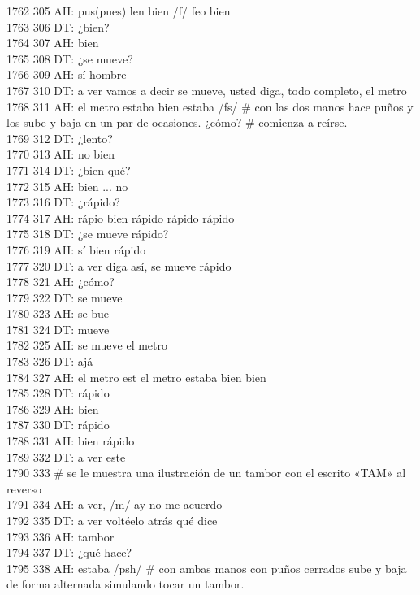 1762 305 AH: pus(pues) len bien /f/ feo bien \\
1763 306 DT: ¿bien?\\
1764 307 AH: bien\\
1765 308 DT: ¿se mueve?\\
1766 309 AH: sí hombre\\
1767 310 DT: a ver vamos a decir se mueve, usted diga, todo completo, el metro\\
1768 311 AH: el metro estaba bien estaba /fs/ # con las dos manos hace puños y los sube y baja en un par de ocasiones. ¿cómo? # comienza a reírse.\\
1769 312 DT: ¿lento?\\
1770 313 AH: no bien\\
1771 314 DT: ¿bien qué?\\
1772 315 AH: bien ... no\\
1773 316 DT: ¿rápido?\\
1774 317 AH: rápio bien rápido rápido rápido\\
1775 318 DT: ¿se mueve rápido?\\
1776 319 AH: sí bien rápido\\
1777 320 DT: a ver diga así, se mueve rápido\\
1778 321 AH: ¿cómo?\\
1779 322 DT: se mueve\\
1780 323 AH: se bue\\
1781 324 DT: mueve\\
1782 325 AH: se mueve el metro\\
1783 326 DT: ajá\\
1784 327 AH: el metro est el metro estaba bien bien \\
1785 328 DT: rápido\\
1786 329 AH: bien\\
1787 330 DT: rápido\\
1788 331 AH: bien rápido\\
1789 332 DT: a ver este\\
1790 333 # se le muestra una ilustración de un tambor con el escrito «TAM» al reverso\\
1791 334 AH: a ver, /m/ ay no me acuerdo\\
1792 335 DT: a ver voltéelo atrás qué dice\\
1793 336 AH: tambor\\
1794 337 DT: ¿qué hace?\\
1795 338 AH: estaba /psh/ # con ambas manos con puños cerrados sube y baja de forma alternada simulando tocar un tambor. \\
